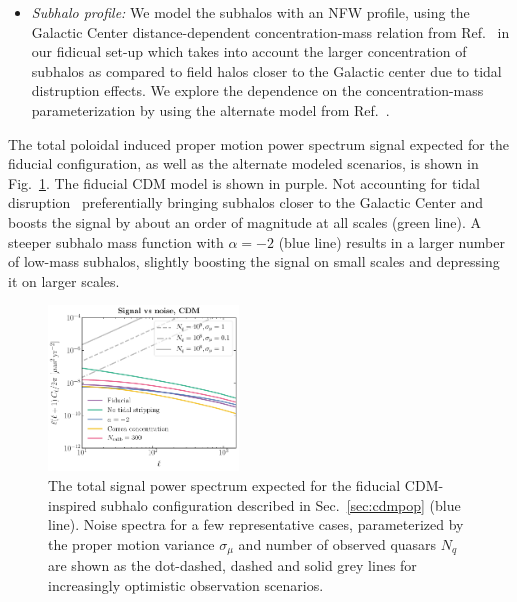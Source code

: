 \documentclass[twocolumn]{aastex63}
\begin{document}
\begin{itemize}
\item \emph{Subhalo profile:} We model the subhalos with an NFW profile, using the Galactic Center distance-dependent concentration-mass relation from Ref.~\cite{Moline:2016pbm} in our fidicual set-up which takes into account the larger concentration of subhalos as compared to field halos closer to the Galactic center due to tidal distruption effects. We explore the dependence on the concentration-mass parameterization by using the alternate model from Ref.~\cite{Correa:2015dva}.

\end{itemize}

The total poloidal induced proper motion power spectrum signal expected for the fiducial configuration, as well as the alternate modeled scenarios, is shown in Fig.~\ref{fig:lcdm_theory}. The fiducial CDM model is shown in purple. Not accounting for tidal disruption~\cite{vandenBosch:2017ynq,vandenBosch:2018tyt} preferentially bringing subhalos closer to the Galactic Center and boosts the signal by about an order of magnitude at all scales (green line). A steeper subhalo mass function with $\alpha=-2$ (blue line) results in a larger number of low-mass subhalos, slightly boosting the signal on small scales and depressing it on larger scales. 

\begin{figure}[htbp]
  \centering
  \includegraphics[width=0.45\textwidth]{plots/LCDMTheoryNoise}
  \caption{The total signal power spectrum expected for the fiducial CDM-inspired subhalo configuration described in Sec.~\ref{sec:cdmpop} (blue line). Noise spectra for a few representative cases, parameterized by the proper motion variance $\sigma_\mu$ and number of observed quasars $N_q$ are shown as the dot-dashed, dashed and solid grey lines for increasingly optimistic observation scenarios.} 
  \label{fig:lcdm_theory}
\end{figure}
\end{document}
